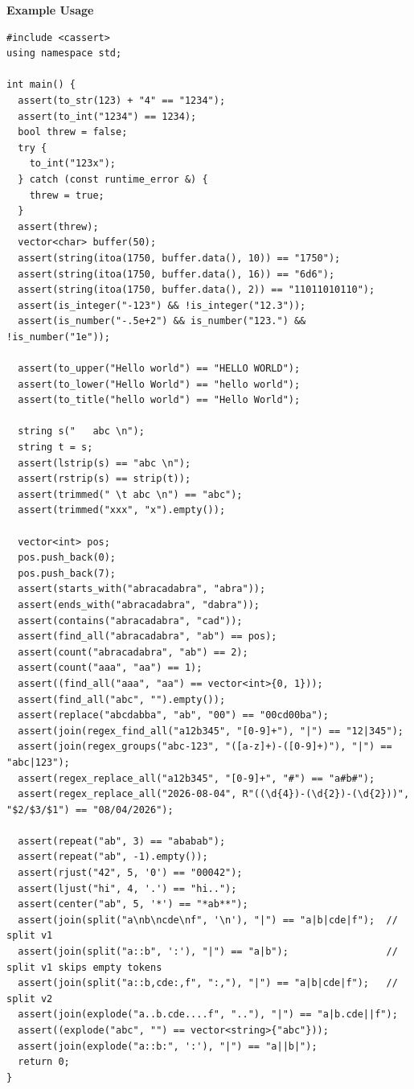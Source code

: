 \textbf{Example Usage}\par
\begin{lstlisting}[style=cpp]
#include <cassert>
using namespace std;

int main() {
  assert(to_str(123) + "4" == "1234");
  assert(to_int("1234") == 1234);
  bool threw = false;
  try {
    to_int("123x");
  } catch (const runtime_error &) {
    threw = true;
  }
  assert(threw);
  vector<char> buffer(50);
  assert(string(itoa(1750, buffer.data(), 10)) == "1750");
  assert(string(itoa(1750, buffer.data(), 16)) == "6d6");
  assert(string(itoa(1750, buffer.data(), 2)) == "11011010110");
  assert(is_integer("-123") && !is_integer("12.3"));
  assert(is_number("-.5e+2") && is_number("123.") && !is_number("1e"));

  assert(to_upper("Hello world") == "HELLO WORLD");
  assert(to_lower("Hello World") == "hello world");
  assert(to_title("hello world") == "Hello World");

  string s("   abc \n");
  string t = s;
  assert(lstrip(s) == "abc \n");
  assert(rstrip(s) == strip(t));
  assert(trimmed(" \t abc \n") == "abc");
  assert(trimmed("xxx", "x").empty());

  vector<int> pos;
  pos.push_back(0);
  pos.push_back(7);
  assert(starts_with("abracadabra", "abra"));
  assert(ends_with("abracadabra", "dabra"));
  assert(contains("abracadabra", "cad"));
  assert(find_all("abracadabra", "ab") == pos);
  assert(count("abracadabra", "ab") == 2);
  assert(count("aaa", "aa") == 1);
  assert((find_all("aaa", "aa") == vector<int>{0, 1}));
  assert(find_all("abc", "").empty());
  assert(replace("abcdabba", "ab", "00") == "00cd00ba");
  assert(join(regex_find_all("a12b345", "[0-9]+"), "|") == "12|345");
  assert(join(regex_groups("abc-123", "([a-z]+)-([0-9]+)"), "|") == "abc|123");
  assert(regex_replace_all("a12b345", "[0-9]+", "#") == "a#b#");
  assert(regex_replace_all("2026-08-04", R"((\d{4})-(\d{2})-(\d{2}))", "$2/$3/$1") == "08/04/2026");

  assert(repeat("ab", 3) == "ababab");
  assert(repeat("ab", -1).empty());
  assert(rjust("42", 5, '0') == "00042");
  assert(ljust("hi", 4, '.') == "hi..");
  assert(center("ab", 5, '*') == "*ab**");
  assert(join(split("a\nb\ncde\nf", '\n'), "|") == "a|b|cde|f");  // split v1
  assert(join(split("a::b", ':'), "|") == "a|b");                 // split v1 skips empty tokens
  assert(join(split("a::b,cde:,f", ":,"), "|") == "a|b|cde|f");   // split v2
  assert(join(explode("a..b.cde....f", ".."), "|") == "a|b.cde||f");
  assert((explode("abc", "") == vector<string>{"abc"}));
  assert(join(explode("a::b:", ':'), "|") == "a||b|");
  return 0;
}
\end{lstlisting}


